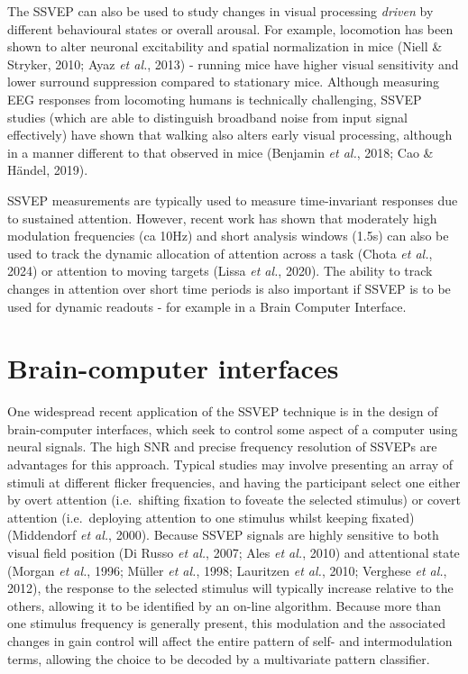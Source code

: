 \documentclass[
  letterpaper,
  DIV=11,
  numbers=noendperiod]{scrartcl}
\begin{document}
The SSVEP can also be used to study changes in visual processing
\textit{driven} by different behavioural states or overall arousal. For
example, locomotion has been shown to alter neuronal excitability and
spatial normalization in mice (Niell \& Stryker, 2010; Ayaz \emph{et
al.}, 2013) - running mice have higher visual sensitivity and lower
surround suppression compared to stationary mice. Although measuring EEG
responses from locomoting humans is technically challenging, SSVEP
studies (which are able to distinguish broadband noise from input signal
effectively) have shown that walking also alters early visual
processing, although in a manner different to that observed in mice
(Benjamin \emph{et al.}, 2018; Cao \& Händel, 2019).

SSVEP measurements are typically used to measure time-invariant
responses due to sustained attention. However, recent work has shown
that moderately high modulation frequencies (ca 10Hz) and short analysis
windows (1.5s) can also be used to track the dynamic allocation of
attention across a task (Chota \emph{et al.}, 2024) or attention to
moving targets (Lissa \emph{et al.}, 2020). The ability to track changes
in attention over short time periods is also important if SSVEP is to be
used for dynamic readouts - for example in a Brain Computer Interface.

\section{Brain-computer interfaces}\label{brain-computer-interfaces}

One widespread recent application of the SSVEP technique is in the
design of brain-computer interfaces, which seek to control some aspect
of a computer using neural signals. The high SNR and precise frequency
resolution of SSVEPs are advantages for this approach. Typical studies
may involve presenting an array of stimuli at different flicker
frequencies, and having the participant select one either by overt
attention (i.e.~shifting fixation to foveate the selected stimulus) or
covert attention (i.e.~deploying attention to one stimulus whilst
keeping fixated) (Middendorf \emph{et al.}, 2000). Because SSVEP signals
are highly sensitive to both visual field position (Di Russo \emph{et
al.}, 2007; Ales \emph{et al.}, 2010) and attentional state (Morgan
\emph{et al.}, 1996; Müller \emph{et al.}, 1998; Lauritzen \emph{et
al.}, 2010; Verghese \emph{et al.}, 2012), the response to the selected
stimulus will typically increase relative to the others, allowing it to
be identified by an on-line algorithm. Because more than one stimulus
frequency is generally present, this modulation and the associated
changes in gain control will affect the entire pattern of self- and
intermodulation terms, allowing the choice to be decoded by a
multivariate pattern classifier.
\end{document}
